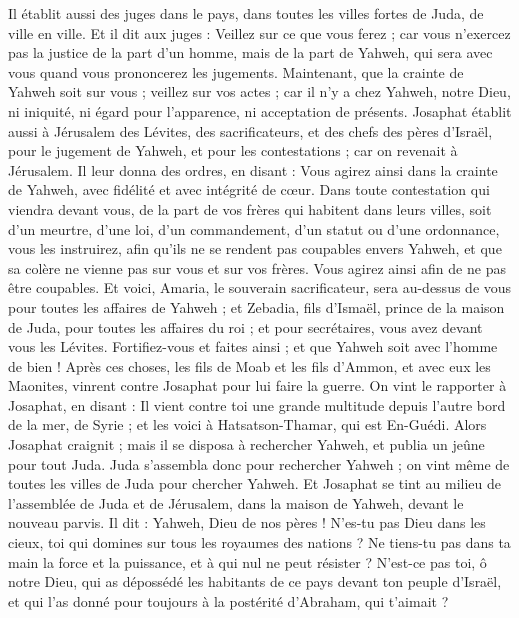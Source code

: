 \begin{multicols}{2}
Il établit aussi des juges dans le pays, dans toutes les villes fortes de Juda, de ville en ville.
Et il dit aux juges : Veillez sur ce que vous ferez ; car vous n'exercez pas la justice de la part d'un homme, mais de la part de Yahweh, qui sera avec vous quand vous prononcerez les jugements.
Maintenant, que la crainte de Yahweh soit sur vous ; veillez sur vos actes ; car il n'y a chez Yahweh, notre Dieu, ni iniquité, ni égard pour l'apparence, ni acceptation de présents.
Josaphat établit aussi à Jérusalem des Lévites, des sacrificateurs, et des chefs des pères d'Israël, pour le jugement de Yahweh, et pour les contestations ; car on revenait à Jérusalem.
Il leur donna des ordres, en disant : Vous agirez ainsi dans la crainte de Yahweh, avec fidélité et avec intégrité de cœur.
Dans toute contestation qui viendra devant vous, de la part de vos frères qui habitent dans leurs villes, soit d'un meurtre, d'une loi, d'un commandement, d'un statut ou d'une ordonnance, vous les instruirez, afin qu'ils ne se rendent pas coupables envers Yahweh, et que sa colère ne vienne pas sur vous et sur vos frères. Vous agirez ainsi afin de ne pas être coupables.
Et voici, Amaria, le souverain sacrificateur, sera au-dessus de vous pour toutes les affaires de Yahweh ; et Zebadia, fils d'Ismaël, prince de la maison de Juda, pour toutes les affaires du roi ; et pour secrétaires, vous avez devant vous les Lévites. Fortifiez-vous et faites ainsi ; et que Yahweh soit avec l'homme de bien !
\VerseOne{}Après ces choses, les fils de Moab et les fils d'Ammon, et avec eux les Maonites, vinrent contre Josaphat pour lui faire la guerre.
On vint le rapporter à Josaphat, en disant : Il vient contre toi une grande multitude depuis l'autre bord de la mer, de Syrie ; et les voici à Hatsatson-Thamar, qui est En-Guédi.
Alors Josaphat craignit ; mais il se disposa à rechercher Yahweh, et publia un jeûne pour tout Juda.
Juda s'assembla donc pour rechercher Yahweh ; on vint même de toutes les villes de Juda pour chercher Yahweh.
Et Josaphat se tint au milieu de l'assemblée de Juda et de Jérusalem, dans la maison de Yahweh, devant le nouveau parvis.
Il dit : Yahweh, Dieu de nos pères ! N'es-tu pas Dieu dans les cieux, toi qui domines sur tous les royaumes des nations ? Ne tiens-tu pas dans ta main la force et la puissance, et à qui nul ne peut résister ?
N'est-ce pas toi, ô notre Dieu, qui as dépossédé les habitants de ce pays devant ton peuple d'Israël, et qui l'as donné pour toujours à la postérité d'Abraham, qui t'aimait ?

\end{multicols}
